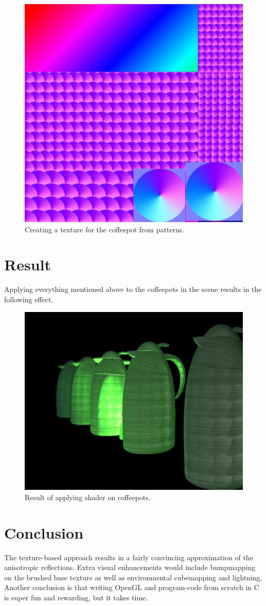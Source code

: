 \documentclass{acmsiggraph}               %
\begin{document}
\begin{figure}[H]
    \centering
    \includegraphics[width=0.5\columnwidth]{anisotropic_direction.jpg}
    \caption{Creating a texture for the coffeepot from patterns.}
    \label{figure}
\end{figure}
\section{Result}

Applying everything mentioned above to the coffeepots in the scene results in
the following effect.

\begin{figure}[H]
    \centering
    \includegraphics[width=0.7\columnwidth]{result.png}
    \caption{Result of applying shader on coffeepots.}
    \label{figure}
\end{figure}

\section{Conclusion}

The texture-based approach results in a fairly convincing approximation of the
anisotropic reflections. Extra visual enhancements would include bumpmapping on
the brushed base texture as well as environmental cubemapping and lightning. \\

Another conclusion is that writing OpenGL and program-code from scratch in C is super fun and
rewarding, but it takes time.



\end{document}
